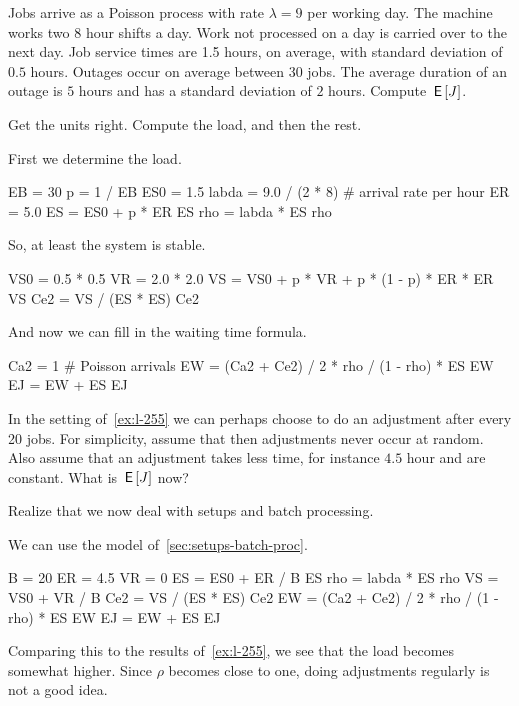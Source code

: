 \begin{exercise}\label{ex:l-255}
 Jobs
arrive as a Poisson process with rate $\lambda=9$ per working day.
 The machine works two $8$ hour shifts a day.
 Work not processed on a day is carried over to the next day.
 Job service times are 1.5 hours, on average, with standard deviation of $0.5$ hours.
 Outages occur on average between $30$ jobs.
The average duration of an outage  is $5$ hours and has a standard deviation of $2$ hours.
 Compute $\,\mathsf{E}\left[J\right]$.
\begin{hint}
 Get the units right.  Compute the load, and then the rest.
\end{hint}
\begin{solution}
First we determine the load. 
\begin{pyconsole}
EB = 30
p = 1 / EB
ES0 = 1.5
labda = 9.0 / (2 * 8)  # arrival rate per hour
ER = 5.0
ES = ES0 + p * ER
ES
rho = labda * ES
rho
\end{pyconsole}
So, at least the system is stable.
\begin{pyconsole}
VS0 = 0.5 * 0.5
VR = 2.0 * 2.0
VS = VS0 + p * VR + p * (1 - p) * ER * ER
VS
Ce2 = VS / (ES * ES)
Ce2
\end{pyconsole}
And now we can fill in the waiting time formula.
\begin{pyconsole}
Ca2 = 1  # Poisson arrivals
EW = (Ca2 + Ce2) / 2 * rho / (1 - rho) * ES
EW
EJ = EW + ES
EJ
\end{pyconsole}
\end{solution}
\end{exercise}


\begin{exercise}\label{ex:104}
In the setting of~\cref{ex:l-255} we can perhaps choose to do an adjustment after every 20 jobs.
For simplicity, assume that then adjustments never occur at random.
Also assume that an adjustment takes less time, for instance $4.5$ hour and are constant.
What is $\,\mathsf{E}\left[J\right]$ now? 
\begin{hint}
Realize that we now deal with setups and batch processing.   
\end{hint}
\begin{solution}
We can use the model of~\cref{sec:setups-batch-proc}.
\begin{pyconsole}
B = 20
ER = 4.5
VR = 0
ES = ES0 + ER / B
ES
rho = labda * ES
rho
VS = VS0 + VR / B
Ce2 = VS / (ES * ES)
Ce2
EW = (Ca2 + Ce2) / 2 * rho / (1 - rho) * ES
EW
EJ = EW + ES
EJ
\end{pyconsole}
Comparing this to the results of~\cref{ex:l-255}, we see that the load becomes somewhat higher. Since $\rho$ becomes close to one, doing adjustments regularly is not a good idea.   
\end{solution}
\end{exercise}


